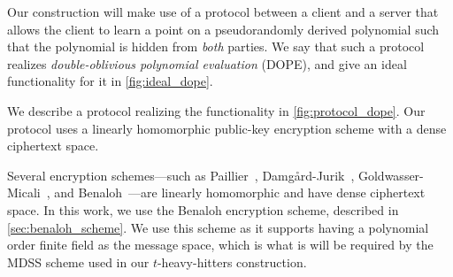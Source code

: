 Our construction will make use of a protocol between a client and a server that allows the client to learn a point on a pseudorandomly derived polynomial such that the polynomial is hidden from \emph{both} parties.
We say that such a protocol realizes \emph{double-oblivious polynomial evaluation} (DOPE), and give an ideal functionality for it in
\cref{fig:ideal_dope}.



We describe a protocol realizing the functionality in \cref{fig:protocol_dope}.
Our protocol uses a linearly homomorphic public-key encryption scheme with a dense ciphertext space.

Several encryption schemes---such as Paillier~\autocite{EC:Paillier99}, Damg\aa{}rd-Jurik~\autocite{PKC:DamJur01}, Goldwasser-Micali~\autocite{STOC:GolMic82}, and Benaloh~\autocite{SAC:Ben94}---are linearly homomorphic and have dense ciphertext space.
In this work, we use the Benaloh encryption scheme, described in \cref{sec:benaloh_scheme}.
We use this scheme as it supports having a polynomial order finite field as the message space, which is what is will be required by the MDSS scheme used in our $t$-heavy-hitters construction.


